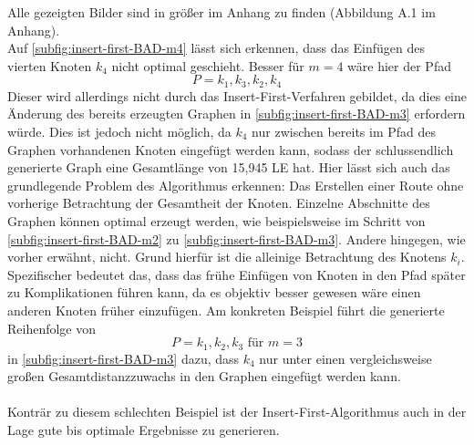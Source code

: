 Alle gezeigten Bilder sind in größer im Anhang zu finden (Abbildung A.1 im Anhang).\\
Auf \vref{subfig:insert-first-BAD-m4} lässt sich erkennen, dass das Einfügen des vierten Knoten $k_4$ nicht optimal geschieht. 
Besser für $m = 4$ wäre hier der Pfad 
    $$P=k_1, k_3, k_2, k_4$$
Dieser wird allerdings nicht durch das Insert-First-Verfahren gebildet, da dies eine Änderung des bereits erzeugten Graphen in \vref{subfig:insert-first-BAD-m3} erfordern würde. 
Dies ist jedoch nicht möglich, da $k_4$ nur zwischen bereits im Pfad des Graphen vorhandenen Knoten eingefügt werden kann, sodass der schlussendlich generierte Graph eine Gesamtlänge von 15,945 \ac{LE} hat.
Hier lässt sich auch das grundlegende Problem des Algorithmus erkennen: Das Erstellen einer Route ohne vorherige Betrachtung der Gesamtheit der Knoten. 
Einzelne Abschnitte des Graphen können optimal erzeugt werden, wie beispielsweise im Schritt von \vref{subfig:insert-first-BAD-m2} zu \vref{subfig:insert-first-BAD-m3}. 
Andere hingegen, wie vorher erwähnt, nicht. 
Grund hierfür ist die alleinige Betrachtung des Knotens $k_i$. 
Spezifischer bedeutet das, dass das frühe Einfügen von Knoten in den Pfad später zu Komplikationen führen kann, da es objektiv besser gewesen wäre einen anderen Knoten früher einzufügen.
Am konkreten Beispiel führt die generierte Reihenfolge von 
    $$P=k_1, k_2, k_3 \textrm{ für } m=3$$
in \vref{subfig:insert-first-BAD-m3} dazu, dass $k_4$ nur unter einen vergleichsweise großen Gesamtdistanzzuwachs in den Graphen eingefügt werden kann. 
\\\\
Konträr zu diesem schlechten Beispiel ist der Insert-First-Algorithmus auch in der Lage gute bis optimale Ergebnisse zu generieren. 

